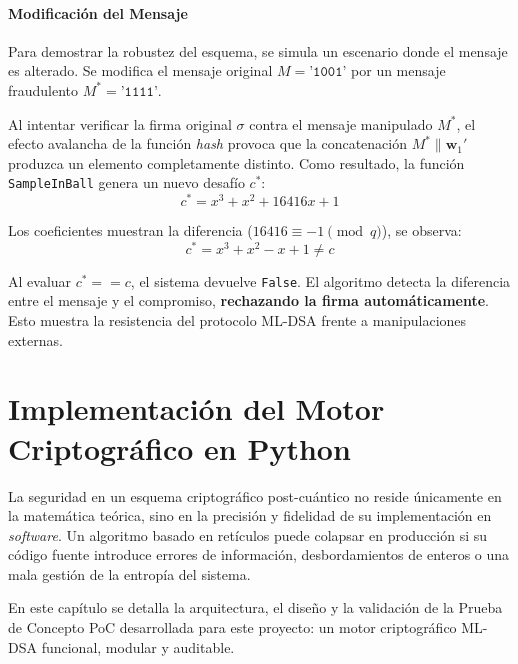 \documentclass[11pt, a4paper]{report}
\theoremstyle{definition}
\begin{document}
\subsubsection*{Modificación del Mensaje}
Para demostrar la robustez del esquema, se simula un escenario donde el mensaje es alterado. Se modifica el mensaje original $M = \texttt{'1001'}$ por un mensaje fraudulento $M^* = \texttt{'1111'}$.

Al intentar verificar la firma original $\sigma$ contra el mensaje manipulado $M^*$, el efecto avalancha de la función \textit{hash} provoca que la concatenación $M^* \parallel \mathbf{w}_1'$ produzca un elemento completamente distinto. Como resultado, la función \texttt{SampleInBall} genera un nuevo desafío $c^*$:
\begin{equation}
    c^* = x^3 + x^2 + 16416x + 1
\end{equation}

Los coeficientes muestran la diferencia ($16416 \equiv -1 \pmod{q}$), se observa:
\begin{equation}
    c^* = x^3 + x^2 - x + 1 \neq c
\end{equation}

Al evaluar $c^* == c$, el sistema devuelve \texttt{False}. El algoritmo detecta la diferencia entre el mensaje y el compromiso, \textbf{rechazando la firma automáticamente}. Esto muestra la resistencia del protocolo ML-DSA frente a manipulaciones externas.














\chapter{Implementación del Motor Criptográfico en Python}
\label{ch:implementacion_motor}

La seguridad en un esquema criptográfico post-cuántico no reside únicamente en la matemática teórica, sino en la precisión y fidelidad de su implementación en \textit{software}. Un algoritmo basado en retículos puede colapsar en producción si su código fuente introduce errores de información, desbordamientos de enteros o una mala gestión de la entropía del sistema.

En este capítulo se detalla la arquitectura, el diseño y la validación de la Prueba de Concepto PoC desarrollada para este proyecto: un motor criptográfico ML-DSA funcional, modular y auditable.
\end{document}
